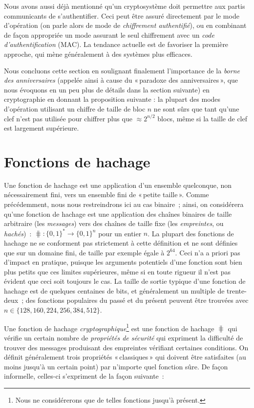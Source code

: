 Nous avons aussi déjà mentionné qu'un cryptosystème doit permettre aux partis communicants de s'authentifier. Ceci peut être assuré directement
par le mode d'opération (on parle alors de mode de \emph{chiffrement authentifié}), ou en combinant de façon appropriée un mode assurant le seul chiffrement avec
un \emph{code d'authentification} (MAC).
La tendance actuelle est de favoriser la première approche, qui mène généralement à des systèmes plus efficaces.


Nous concluons cette section en soulignant finalement l'importance de la \emph{borne des anniversaires} (appelée ainsi à cause du «\,paradoxe des anniversaires\,»,
que nous évoquons en un peu plus de détails dans la section suivante) en cryptographie en donnant la proposition suivante : la plupart des modes d'opération
utilisant un chiffre de taille de bloc $n$ ne sont sûrs que tant qu'une clef n'est pas utilisée pour chiffrer plus que $\approx 2^{n/2}$ blocs,
même si la taille de clef est largement supérieure.




\section{Fonctions de hachage}

Une fonction de hachage est une application d'un ensemble quelconque, non nécessairement fini, vers un ensemble fini de «\,petite taille\,».
Comme précédemment, nous nous restreindrons ici au cas binaire~; ainsi, on considérera qu'une  
fonction de hachage  est une application des chaînes binaires de taille arbitraire (les \emph{messages}) vers des chaînes de taille
fixe (les \emph{empreintes}, ou \emph{hachés})~:
$\hash : \{0,1\}^* \rightarrow \{0,1\}^n$ pour un entier $n$.
La plupart des fonctions de hachage ne se conforment pas strictement à cette définition et ne sont définies que sur un domaine fini, de taille par exemple égale
à $2^{64}$. Ceci n'a a priori pas d'impact en pratique, puisque les arguments potentiels d'une fonction sont bien plus petits que ces
limites supérieures, même si en toute rigueur il n'est pas évident que ceci soit toujours le cas. 
La taille de sortie typique d'une fonction de hachage est de quelques centaines de bits, et généralement un multiple de trente-deux~; des fonctions populaires
du passé et du présent peuvent être trouvées avec 
$n \in \{128, 160, 224, 256, 384, 512\}$.

Une fonction de hachage \emph{cryptographique}\footnote{Nous ne considérerons que de telles fonctions jusqu'à présent.} est une fonction
de hachage $\hash$ qui vérifie un certain nombre de \emph{propriétés de sécurité} qui expriment la difficulté de trouver des messages
produisant des empreintes vérifiant certaines conditions. On définit généralement trois propriétés «\,classiques\,» qui doivent être satisfaites
(au moins jusqu'à un certain point) par n'importe quel fonction sûre. De façon informelle, celles-ci s'expriment de la façon suivante~:

